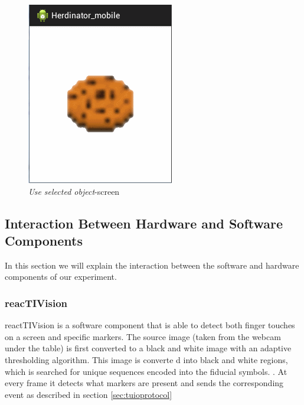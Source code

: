 \documentclass[a4paper,10pt]{report}
\begin{document}
\begin{figure}[ht]
\begin{minipage}[b]{0.30\linewidth}
			\includegraphics[width=\textwidth]{images/android-application-screen3.png}
			\caption{\emph{Use selected object}-screen}
			\label{fig:android-application-screen3}
		\end{minipage}
	\end{figure}

	\subsection{Interaction Between Hardware and Software Components}
	In this section we will explain the interaction between the software and hardware components of our experiment.

	\subsubsection{reacTIVision}
	\label{sec:reactivision}
	reactTIVision is a software component that is able to detect both finger touches on a screen and specific markers. 
	The source image (taken from the webcam under the table) is first converted to a black and white image with an adaptive thresholding algorithm. 
	This image is converte	d into black and white regions, which is searched for unique sequences encoded into the fiducial symbols. \cite{reactivision}.
	At every frame it detects what markers are present and sends the corresponding event as described in section \ref{sec:tuioprotocol}
\end{document}
